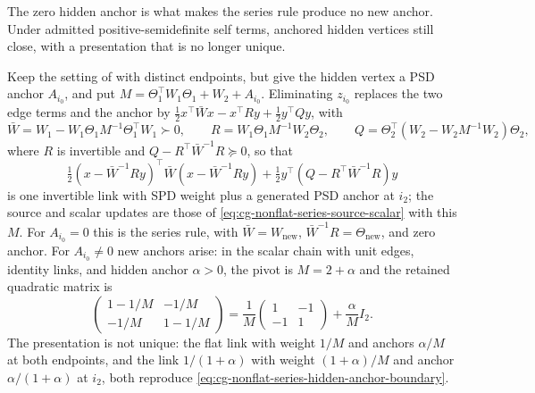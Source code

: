 The zero hidden anchor is what makes the series rule produce no new anchor.
Under admitted positive-semidefinite self terms, anchored hidden vertices still
close, with a presentation that is no longer unique.

Keep the setting of  with distinct
endpoints, but give the hidden vertex a PSD anchor \(A_{i_0}\), and put
\(M=\Theta_1^\top W_1\Theta_1+W_2+A_{i_0}\). Eliminating \(z_{i_0}\) replaces the
two edge terms and the anchor by
\(\frac12x^\top \bar Wx-x^\top Ry+\frac12y^\top Qy\), with
\[
\bar W=W_1-W_1\Theta_1M^{-1}\Theta_1^\top W_1\succ0,\qquad
R=W_1\Theta_1M^{-1}W_2\Theta_2,\qquad
Q=\Theta_2^\top(W_2-W_2M^{-1}W_2)\Theta_2,
\]
where \(R\) is invertible and \(Q-R^\top \bar W^{-1}R\succeq0\), so that
\[
\tfrac12(x-\bar W^{-1}Ry)^\top \bar W(x-\bar W^{-1}Ry)+\tfrac12y^\top(Q-R^\top \bar W^{-1}R)y
\]
is one invertible link with SPD weight plus a generated PSD anchor at
\(i_2\); the source and scalar updates are those of
\eqref{eq:cg-nonflat-series-source-scalar} with this \(M\). For
\(A_{i_0}=0\) this is the series rule, with \(\bar W=W_{\mathrm{new}}\),
\(\bar W^{-1}R=\Theta_{\mathrm{new}}\), and zero anchor. For \(A_{i_0}\neq0\) new
anchors arise: in the scalar chain with unit edges, identity links, and hidden
anchor \(\alpha>0\), the pivot is \(M=2+\alpha\) and the retained quadratic
matrix is
\begin{equation}
\begin{pmatrix}1-1/M&-1/M\\-1/M&1-1/M\end{pmatrix}
=\frac1M\begin{pmatrix}1&-1\\-1&1\end{pmatrix}
+\frac{\alpha}{M}I_2 .
\label{eq:cg-nonflat-series-hidden-anchor-boundary}
\end{equation}
The presentation is not unique: the flat link with weight \(1/M\) and anchors
\(\alpha/M\) at both endpoints, and the link \(1/(1+\alpha)\) with weight
\((1+\alpha)/M\) and anchor \(\alpha/(1+\alpha)\) at \(i_2\), both reproduce
\eqref{eq:cg-nonflat-series-hidden-anchor-boundary}. 

